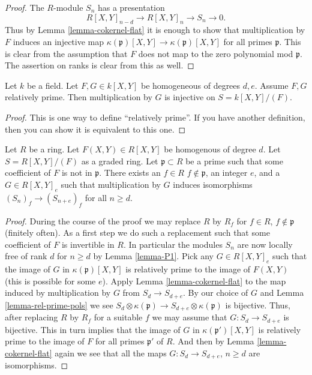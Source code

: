 \begin{proof}
The $R$-module $S_n$ has a presentation
$$
R[X,Y]_{n-d} \to R[X,Y]_n \to S_n \to 0.
$$
Thus by Lemma \ref{lemma-cokernel-flat}
it is enough to show that multiplication
by $F$ induces an injective map
$\kappa(\mathfrak p)[X,Y]
\to \kappa(\mathfrak p)[X,Y]$
for all primes $\mathfrak p$.
This is clear from the assumption that
$F$ does not map to the zero polynomial mod $\mathfrak p$.
The assertion on ranks is clear from this as well.
\end{proof}

\begin{lemma}
\label{lemma-rel-prime-pols}
Let $k$ be a field. Let $F,G \in k[X,Y]$ be homogeneous
of degrees $d,e$. Assume $F,G$ relatively prime.
Then multiplication by $G$ is injective on $S = k[X,Y]/(F)$.
\end{lemma}

\begin{proof}
This is one way to define ``relatively prime''. If you have another
definition, then you can show it is equivalent to this one.
\end{proof}

\begin{lemma}
\label{lemma-P1-localize}
Let $R$ be a ring. Let $F(X,Y) \in R[X,Y]$ be homogenous of degree
$d$. Let $S = R[X,Y]/(F)$ as a graded ring.
Let $\mathfrak p \subset R$ be a prime such that
some coefficient of $F$ is not in $\mathfrak p$.
There exists an $f \in R$ $f \not\in \mathfrak p$,
an integer $e$, and a $G \in R[X,Y]_e$
such that multiplication by $G$ induces isomorphisms
$(S_n)_f \to (S_{n+e})_f$ for all $n \geq d$.
\end{lemma}

\begin{proof}
During the course of the proof we may replace $R$ by $R_f$
for $f\in R$, $f\not\in \mathfrak p$ (finitely often).
As a first step we do such a replacement such that
some coefficient of $F$ is invertible in $R$.
In particular the modules $S_n$ are now locally
free of rank $d$ for $n \geq d$ by Lemma \ref{lemma-P1}.
Pick any $G \in R[X,Y]_e$ such that the image of
$G$ in $\kappa(\mathfrak p)[X,Y]$ is relatively
prime to the image of $F(X,Y)$ (this is possible for some $e$).
Apply Lemma \ref{lemma-cokernel-flat} to the map
induced by multiplication by $G$ from $S_{d} \to S_{d+e}$.
By our choice of $G$ and Lemma \ref{lemma-rel-prime-pols}
we see
$S_{d}\otimes \kappa(\mathfrak p) \to S_{d+e} \otimes \kappa(\mathfrak p)$
is bijective. Thus, after replacing $R$ by $R_f$ for a suitable
$f$ we may assume that $G : S_{d} \to S_{d+e}$
is bijective. This in turn implies that the image
of $G$ in $\kappa(\mathfrak p')[X,Y]$ is relatively
prime to the image of $F$ for all primes $\mathfrak p'$ 
of $R$. And then by Lemma \ref{lemma-cokernel-flat}
again we see that all the maps
$G : S_{d} \to S_{d+e}$, $n \geq d$ are isomorphisms.
\end{proof}

